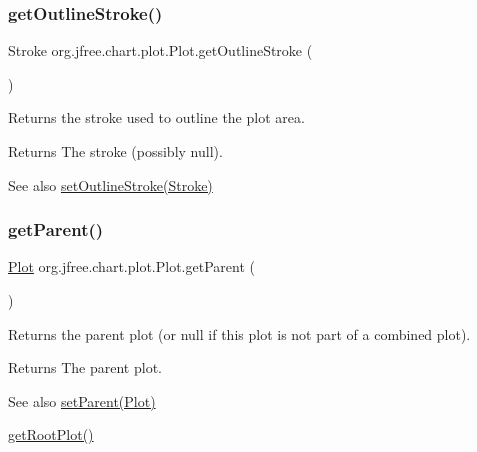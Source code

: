 \subsubsection{\texorpdfstring{get\+Outline\+Stroke()}{getOutlineStroke()}}
{\footnotesize\ttfamily Stroke org.\+jfree.\+chart.\+plot.\+Plot.\+get\+Outline\+Stroke (\begin{DoxyParamCaption}{ }\end{DoxyParamCaption})}

Returns the stroke used to outline the plot area.

\begin{DoxyReturn}{Returns}
The stroke (possibly {\ttfamily null}).
\end{DoxyReturn}
\begin{DoxySeeAlso}{See also}
\mbox{\hyperlink{classorg_1_1jfree_1_1chart_1_1plot_1_1_plot_a5deedaa7421aebeefe7ac0cfb77b37fb}{set\+Outline\+Stroke(\+Stroke)}} 
\end{DoxySeeAlso}
\mbox{\label{classorg_1_1jfree_1_1chart_1_1plot_1_1_plot_a7dd8b47d0a7ec2a24291ee9e29c9a9ba}} 
\subsubsection{\texorpdfstring{get\+Parent()}{getParent()}}
{\footnotesize\ttfamily \mbox{\hyperlink{classorg_1_1jfree_1_1chart_1_1plot_1_1_plot}{Plot}} org.\+jfree.\+chart.\+plot.\+Plot.\+get\+Parent (\begin{DoxyParamCaption}{ }\end{DoxyParamCaption})}

Returns the parent plot (or {\ttfamily null} if this plot is not part of a combined plot).

\begin{DoxyReturn}{Returns}
The parent plot.
\end{DoxyReturn}
\begin{DoxySeeAlso}{See also}
\mbox{\hyperlink{classorg_1_1jfree_1_1chart_1_1plot_1_1_plot_afdbfc2dc3e4eafa1fb53b699bc8e088d}{set\+Parent(\+Plot)}} 

\mbox{\hyperlink{classorg_1_1jfree_1_1chart_1_1plot_1_1_plot_ace0910e2ba9df3867dd6992163012ba3}{get\+Root\+Plot()}} 
\end{DoxySeeAlso}
\mbox{\label{classorg_1_1jfree_1_1chart_1_1plot_1_1_plot_a1bbedf6241695cf9ecfc3fe08f9f05b6}} 

